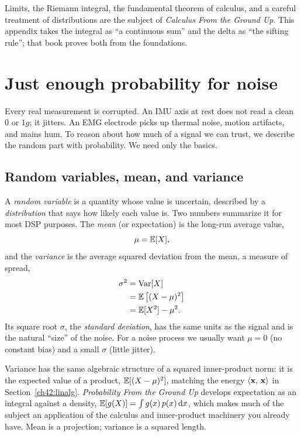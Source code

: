 \begin{connectionbox}
Limits, the Riemann integral, the fundamental theorem of calculus, and a careful treatment of
distributions are the subject of \emph{Calculus From the Ground Up}. This appendix takes the
integral as ``a continuous sum'' and the delta as ``the sifting rule''; that book proves both
from the foundations.
\end{connectionbox}

\section{Just enough probability for noise}
\label{ch42:probability}

Every real measurement is corrupted. An IMU axis at rest does not read a clean $0$ or $1g$; it
jitters. An EMG electrode picks up thermal noise, motion artifacts, and mains hum. To reason
about how much of a signal we can trust, we describe the random part with probability. We need
only the basics.

\subsection{Random variables, mean, and variance}

A \emph{random variable} is a quantity whose value is uncertain, described by a
\emph{distribution} that says how likely each value is. Two numbers summarize it for most DSP
purposes. The \emph{mean} (or expectation) is the long-run average value,
\[
  \mu = \operatorname{\mathbb{E}}[X],
\]
and the \emph{variance} is the average squared deviation from the mean, a measure of spread,
\begin{align*}
  \sigma^2 &= \operatorname{Var}[X] \\
  &= \operatorname{\mathbb{E}}\big[(X - \mu)^2\big] \\
  &= \operatorname{\mathbb{E}}[X^2] - \mu^2.
\end{align*}
Its square root $\sigma$, the \emph{standard deviation}, has the same units as the signal and is
the natural ``size'' of the noise. For a noise process we usually want $\mu = 0$ (no constant
bias) and a small $\sigma$ (little jitter).

\begin{connectionbox}
Variance has the same algebraic structure of a squared inner-product norm: it is the expected value of a product,
$\operatorname{\mathbb{E}}[(X-\mu)^2]$, matching the energy $\langle \mathbf{x},\, \mathbf{x} \rangle$ in Section~\ref{ch42:linalg}.
\emph{Probability From the Ground Up} develops expectation as an
integral against a density, $\operatorname{\mathbb{E}}[g(X)] = \int g(x)\,p(x)\,\mathrm{d} x$, which makes much of the subject an
application of the calculus and inner-product machinery you already have. Mean is a projection;
variance is a squared length.
\end{connectionbox}

